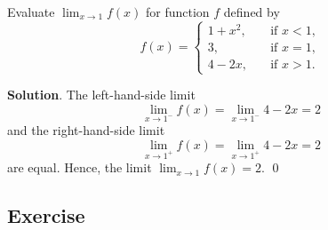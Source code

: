 \documentclass[11pt]{book}
\theoremstyle{break}
\theoremstyle{no_label}
\numberwithin{equation}{section}
\begin{document}
\begin{example}
    Evaluate $\displaystyle\lim_{x\to 1}f(x)$ for function $f$ defined by $$f(x)=\left\{\begin{array}{rl}
        1+x^2, \quad & \text{if $x<1$},\\
        3, \quad & \text{if $x=1$},\\
        4-2x, \quad & \text{if $x>1$}.
    \end{array}\right.$$
\end{example}
\textbf{Solution}. The left-hand-side limit $$\lim_{x\to 1^-}f(x)=\lim_{x\to 1^-}4-2x=2$$ and the right-hand-side limit $$\lim_{x\to 1^+}f(x)=\lim_{x\to 1^+}4-2x=2$$ are equal. Hence, the limit $\displaystyle\lim_{x\to 1}f(x)=2$. \qed

\subsection*{Exercise}
\end{document}
